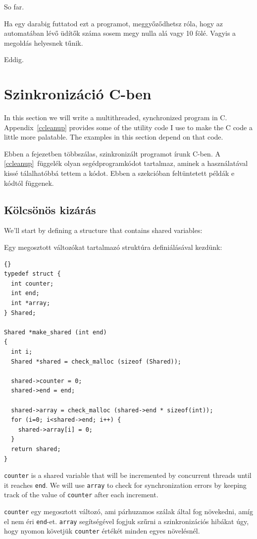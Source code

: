 \documentclass{book}
\begin{document}
So far.

Ha egy darabig futtatod ezt a programot, meggyőződhetsz róla, hogy
az automatában lévő üdítők száma sosem megy nulla alá vagy 10 fölé.
Vagyis a megoldás helyesnek tűnik.

Eddig.


\chapter{Szinkronizáció C-ben}
\label{csync}

In this section we will write a multithreaded, synchronized
program in C.  Appendix~\ref{ccleanup} provides some of the utility
code I use to make the C code a little more palatable.  The
examples in this section depend on that code.

Ebben a fejezetben többszálas, szinkronizált programot írunk C-ben.
A \ref{ccleanup}~függelék olyan segédprogramkódot tartalmaz,
aminek a használatával kissé tálalhatóbbá tettem a kódot.
Ebben a szekcióban feltüntetett példák e kódtól függenek.

\section{Kölcsönös kizárás}

We'll start by defining a structure that contains shared
variables:

Egy megosztott változókat tartalmazó struktúra definiálásával kezdünk:

\begin{lstlisting}[title={}]{}
typedef struct {
  int counter;
  int end;
  int *array;
} Shared;

Shared *make_shared (int end)
{
  int i;
  Shared *shared = check_malloc (sizeof (Shared));

  shared->counter = 0;
  shared->end = end;

  shared->array = check_malloc (shared->end * sizeof(int));
  for (i=0; i<shared->end; i++) {
    shared->array[i] = 0;
  }
  return shared;
}
\end{lstlisting}

{\tt counter} is a shared variable that will be incremented by
concurrent threads until it reaches {\tt end}.  We will use
{\tt array} to check for synchronization errors by keeping track
of the value of {\tt counter} after each increment.


{\tt counter} egy megosztott változó, ami párhuzamos szálak által fog
növekedni, amíg el nem éri {\tt end}-et.
{\tt array} segítségével fogjuk szűrni a szinkronizációs hibákat úgy,
hogy nyomon követjük {\tt counter} értékét minden egyes növelésnél.
\end{document}
